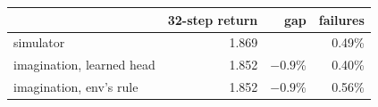 \begin{tabular}{lrrr}\toprule
 & 32-step return & gap & failures \\\midrule
simulator & 1.869 &  & 0.49\% \\
imagination, learned head & 1.852 & $-0.9$\% & 0.40\% \\
imagination, env's rule & 1.852 & $-0.9$\% & 0.56\% \\
\bottomrule\end{tabular}

